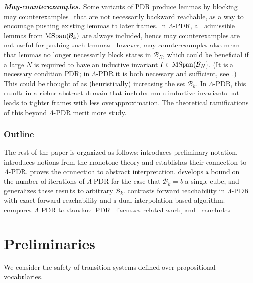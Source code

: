 \documentclass[acmsmall,screen]{acmart}
\newcommand{\para}[1]{\vspace{2pt}\noindent\textbf{\textit{#1.}}}
\newcommand{\bkwrch}[1]{\mathcal{B}_{#1}}
\newcommand{\mspan}[1]{{\rm MSpan}({#1})}
\newcommand{\bkwspan}[1]{\mspan{\bkwrch{#1}}}
\newcommand{\bkcube}{b}
\begin{document}
\para{May-counterexamples}
\label{sec:overview-may-cexs}
Some variants of PDR produce lemmas by blocking may counterexamples~\cite{DBLP:conf/fmcad/GurfinkelI15} that are not necessarily backward reachable, as a way to encourage pushing existing lemmas to later frames.
In $\Lambda$-PDR, all admissible lemmas from $\bkwspan{k}$ are always included, hence may counterexamples are not useful for pushing such lemmas.
%
However, may counterexamples also mean that lemmas no longer necessarily block states in $\bkwrch{N}$, which could be beneficial if a large $N$ is required to have an inductive invariant $I \in \bkwspan{N}$.
(It is a necessary condition PDR; in $\Lambda$-PDR it is both necessary and sufficient, see~.)
%
This could be thought of as (heuristically) increasing the set $\bkwrch{k}$. In $\Lambda$-PDR, this results in a richer abstract domain that includes more inductive invariants but leads to tighter frames with less overapproximation. The theoretical ramifications of this beyond $\Lambda$-PDR merit more study.

%
%
%

%

\subsubsection{Outline}
The rest of the paper is organized as follows:
 introduces preliminary notation.
 introduces notions from the monotone theory and establishes their connection to $\Lambda$-PDR.
 proves the connection to abstract interpretation.
 develops a bound on the number of iterations of $\Lambda$-PDR for the case that $\bkwrch{k}=\bkcube$ a single cube, and  generalizes these results to arbitrary $\bkwrch{k}$. %
 contrasts forward reachability in $\Lambda$-PDR with exact forward reachability and a dual interpolation-based algorithm.
 compares $\Lambda$-PDR to standard PDR.
 discusses related work, and~ concludes.  
%
\section{Preliminaries}
\label{sec:prelim}
%
We consider the safety of transition systems defined over propositional vocabularies. %
\end{document}
